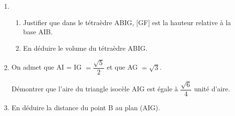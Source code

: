 \documentclass[11pt]{article}
\begin{document}
\medskip

\begin{enumerate}
\item 
	\begin{enumerate}
		\item Justifier que dans le tétraèdre ABIG, [GF] est la hauteur relative à la base AIB. 
		\item En déduire le volume du tétraèdre ABIG.
	\end{enumerate}
\item On admet que AI = IG $= \dfrac{\sqrt{5}}{2}$ et que AG $= \sqrt 3$.

Démontrer que l'aire du triangle isocèle AIG est égale à $\dfrac{\sqrt{6}}{4}$ unité d'aire.
\item En déduire la distance du point B au plan (AIG).
\end{enumerate}
\end{document}
